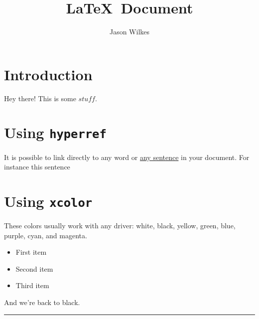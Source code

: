 \documentclass[12pt]{article}
\title{\LaTeX\ Document}
\author{Jason Wilkes}
\date{}
\def\ni{\noindent}
\DeclareRobustCommand{\stuff}{\ensuremath{\mathit{stuff}}}
\begin{document}
\maketitle


\section{Introduction}
Hey there! This is some \stuff.

\section{Using \texttt{hyperref}}
It is possible to link directly to any word or \hyperlink{mylink}{any sentence} in your document.
For instance \hypertarget{mylink}{this sentence}

\section{Using \texttt{xcolor}}
These colors usually work with any driver: white, black, yellow, green, blue, purple, cyan, and magenta.


\begin{itemize}
\color{blue} \item First item
\color{MyColor1}\item Second item
\color{MyColor2}\item Third item
\end{itemize}


\ni
And we're back to black.

\ni
{\color{red} \rule{\linewidth}{0.1em}}
\end{document}
